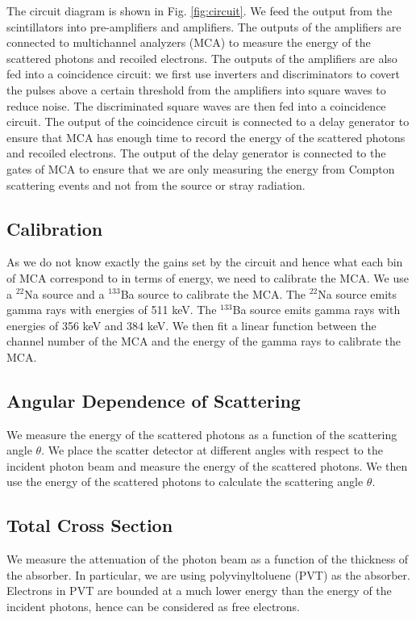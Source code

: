 The circuit diagram is shown in Fig. \ref{fig:circuit}. We feed the output from the scintillators into pre-amplifiers and amplifiers. The outputs of the amplifiers are connected to multichannel analyzers (MCA) to measure the energy of the scattered photons and recoiled electrons. The outputs of the amplifiers are also fed into a coincidence circuit: we first use inverters and discriminators to covert the pulses above a certain threshold from the amplifiers into square waves to reduce noise. The discriminated square waves are then fed into a coincidence circuit. The output of the coincidence circuit is connected to a delay generator to ensure that MCA has enough time to record the energy of the scattered photons and recoiled electrons. The output of the delay generator is connected to the gates of MCA to ensure that we are only measuring the energy from Compton scattering events and not from the source or stray radiation.

\subsection{Calibration}
As we do not know exactly the gains set by the circuit and hence what each bin of MCA correspond to in terms of energy, we need to calibrate the MCA. We use a $^{22}$Na source and a $^{133}$Ba source to calibrate the MCA. The $^{22}$Na source emits gamma rays with energies of 511 keV. The $^{133}$Ba source emits gamma rays with energies of 356 keV and 384 keV. We then fit a linear function between the channel number of the MCA and the energy of the gamma rays to calibrate the MCA.

\subsection{Angular Dependence of Scattering}
We measure the energy of the scattered photons as a function of the scattering angle $\theta$. We place the scatter detector at different angles with respect to the incident photon beam and measure the energy of the scattered photons. We then use the energy of the scattered photons to calculate the scattering angle $\theta$.

\subsection{Total Cross Section}
We measure the attenuation of the photon beam as a function of the thickness of the absorber. In particular, we are using polyvinyltoluene (PVT) as the absorber. Electrons in PVT are bounded at a much lower energy than the energy of the incident photons, hence can be considered as free electrons.

